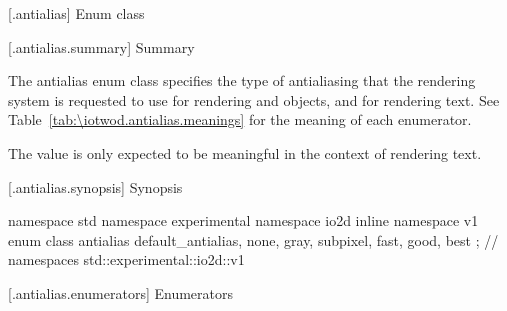  [\iotwod.antialias] {Enum class }

 [\iotwod.antialias.summary] { Summary}

\pnum
The antialias enum class specifies the type of antialiasing that the rendering
system is requested to use for rendering  and 
 objects, and for rendering text. See 
Table~\ref{tab:\iotwod.antialias.meanings} for the meaning of each
 enumerator.

\pnum
\enternote
The value  is only expected to be meaningful in the 
context of rendering text.
\exitnote

 [\iotwod.antialias.synopsis] { Synopsis}

\begin{codeblock}
namespace std { namespace experimental { namespace io2d { inline namespace v1 {
  enum class antialias {
    default_antialias,
    none,
    gray,
    subpixel,
    fast,
    good,
    best
  };
} } } } // namespaces std::experimental::io2d::v1
\end{codeblock}

 [\iotwod.antialias.enumerators] { Enumerators}

